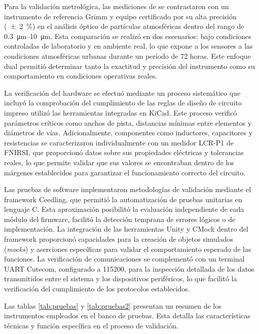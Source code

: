 Para la validación metrológica, las mediciones de \MPF se contrastaron con un instrumento de referencia Grimm y equipo certificado por su alta precisión (\SI{\pm2}{\percent}) en el análisis óptico de partículas atmosféricas dentro del rango de \SIrange{0.3}{10}{\micro\meter}. Esta comparación se realizó en dos escenarios: bajo condiciones controladas de laboratorio y en ambiente real, lo que expone a los sensores a las condiciones atmosféricas urbanas durante un período de 72 horas. Este enfoque dual permitió determinar tanto la exactitud y precisión del instrumento como su comportamiento en condiciones operativas reales.

La verificación del hardware se efectuó mediante un proceso sistemático que incluyó la comprobación del cumplimiento de las reglas de diseño de circuito impreso utilizó las herramientas integradas en KiCad. Este proceso verificó parámetros críticos como anchos de pista, distancias mínimas entre elementos y diámetros de vías. Adicionalmente, componentes  como inductores, capacitores y resistencias se caracterizaron individualmente con un medidor LCR-P1 de FNIRSI, que proporcionó datos  sobre sus propiedades eléctricas y tolerancias reales, lo que permite validar que sus valores se encontraban dentro de los márgenes establecidos para garantizar el funcionamiento correcto del circuito.

Las pruebas de software implementaron metodologías de validación mediante el framework Ceedling, que permitió la automatización de pruebas unitarias en lenguaje C. Esta aproximación posibilitó la evaluación independiente de cada módulo del firmware, facilitó la detección temprana de errores lógicos o de implementación. La integración de las herramientas Unity y CMock dentro del framework proporcionó capacidades para la creación de objetos simulados (\textit{mocks}) y aserciones específicas para validar el comportamiento esperado de las funciones. La verificación de comunicaciones se complementó con un terminal UART Cutecom, configurado a \SI{115200}{\baud}, para la inspección detallada de los datos transmitidos entre el sistema y los dispositivos periféricos, lo que facilitó la verificación del cumplimiento de los protocolos establecidos.

Las tablas \ref{tab:pruebas} y  \ref{tab:pruebas2} presentan un resumen  de los instrumentos empleados en el banco de pruebas. Esta detalla las características técnicas y función específica en el proceso de validación.





